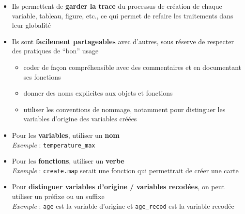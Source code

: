 \documentclass[
  french,
  10pt,
  a4paper,
]{article}
\providecommand{\tightlist}{%
  \setlength{\itemsep}{0pt}\setlength{\parskip}{0pt}}
\begin{document}
\begin{itemize}
\tightlist
\item
  Ils permettent de \textbf{garder la trace} du processus de création de
  chaque variable, tableau, figure, etc., ce qui permet de refaire les
  traitements dans leur globalité\\
\item
  Ils sont \textbf{facilement partageables} avec d'autres, sous réserve
  de respecter des pratiques de ``bon'' usage

  \begin{itemize}
  \tightlist
  \item
    coder de façon compréhensible avec des commentaires et en
    documentant ses fonctions\\
  \item
    donner des noms explicites aux objets et fonctions
  \item
    utiliser les conventions de nommage, notamment pour distinguer les
    variables d'origine des variables créées
  \end{itemize}
\end{itemize}

\begin{tcolorbox}[enhanced jigsaw, arc=.35mm, bottomrule=.15mm, breakable, colback=white, colframe=quarto-callout-tip-color-frame, left=2mm, leftrule=.75mm, opacityback=0, rightrule=.15mm, toprule=.15mm]
\begin{minipage}[t]{5.5mm}
\textcolor{quarto-callout-tip-color}{\faLightbulb}
\end{minipage}%
\begin{minipage}[t]{\textwidth - 5.5mm}

\begin{itemize}
\tightlist
\item
  Pour les \textbf{variables}, utiliser un \textbf{nom}\\
  \emph{Exemple} : \texttt{temperature\_max}
\item
  Pour les \textbf{fonctions}, utiliser un \textbf{verbe}\\
  \emph{Exemple} : \texttt{create.map} serait une fonction qui
  permettrait de créer une carte
\item
  Pour \textbf{distinguer variables d'origine / variables recodées}, on
  peut utiliser un préfixe ou un suffixe\\
  \emph{Exemple} : \texttt{age} est la variable d'origine et
  \texttt{age\_recod} est la variable recodée
\end{itemize}

\end{minipage}%
\end{tcolorbox}
\end{document}
